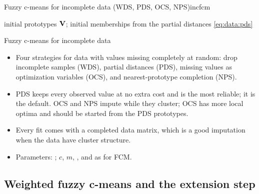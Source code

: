 \begin{algobox}{Fuzzy c-means for incomplete data (WDS, PDS, OCS, NPS)}{incfcm}
\begin{algorithm}[H]
initial prototypes $\mathbf{V}$; initial memberships from the partial distances \eqref{eq:data:pds}\;
\end{algorithm}
\end{algobox}
\begin{summarybox}{Fuzzy c-means for incomplete data}
\begin{itemize}
  \item Four strategies for data with values missing completely at random: drop incomplete samples (WDS), partial distances (PDS), missing values as optimization variables (OCS), and nearest-prototype completion (NPS).
  \item PDS keeps every observed value at no extra cost and is the most reliable; it is the default. OCS and NPS impute while they cluster; OCS has more local optima and should be started from the PDS prototypes.
  \item Every fit comes with a completed data matrix, which is a good imputation when the data have cluster structure.
  \item Parameters: ; $c$, $m$, , and  as for FCM.
\end{itemize}
\end{summarybox}

\subsection{Weighted fuzzy c-means and the extension step}\label{sec:data:wfcm}

